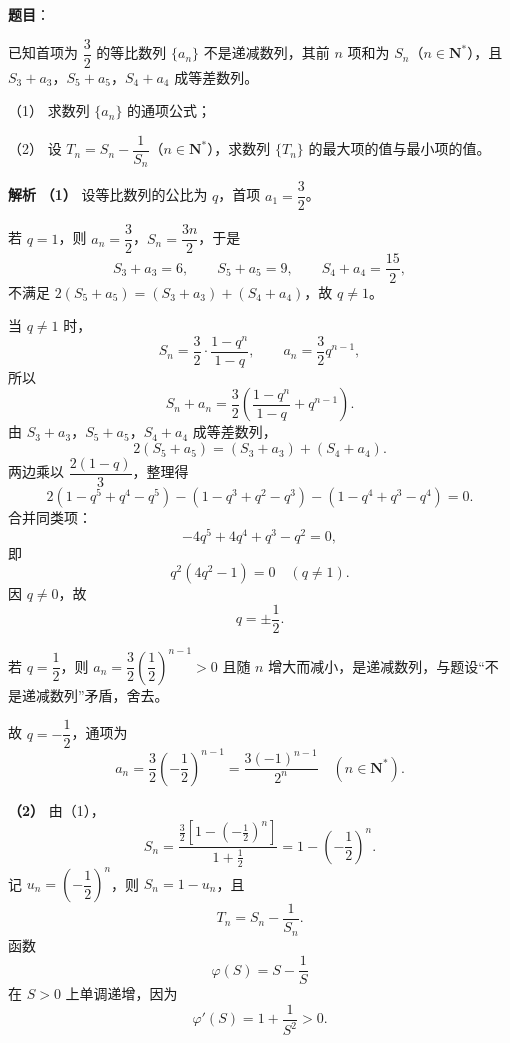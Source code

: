 \begin{answer}

\textbf{题目}：

已知首项为 $\dfrac32$ 的等比数列 $\{a_n\}$ 不是递减数列，其前 $n$ 项和为 $S_n$（$n\in\mathbf{N}^{*}$），且 $S_3+a_3$，$S_5+a_5$，$S_4+a_4$ 成等差数列。

（1） 求数列 $\{a_n\}$ 的通项公式；

（2） 设 $T_n=S_n-\dfrac{1}{S_n}$（$n\in\mathbf{N}^{*}$），求数列 $\{T_n\}$ 的最大项的值与最小项的值。

\textbf{解析}
\textbf{（1）} 设等比数列的公比为 $q$，首项 $a_1=\dfrac32$。

若 $q=1$，则 $a_n=\dfrac32$，$S_n=\dfrac{3n}{2}$，于是
\nopagebreak[4]
\[S_3+a_3=6,\qquad S_5+a_5=9,\qquad S_4+a_4=\frac{15}{2},\]
不满足 $2(S_5+a_5)=(S_3+a_3)+(S_4+a_4)$，故 $q\neq1$。

当 $q\neq1$ 时，
\nopagebreak[4]
\[S_n=\frac32\cdot\frac{1-q^n}{1-q},\qquad a_n=\frac32q^{n-1},\]
所以
\nopagebreak[4]
\[S_n+a_n=\frac32\left(\frac{1-q^n}{1-q}+q^{n-1}\right).\]
由 $S_3+a_3$，$S_5+a_5$，$S_4+a_4$ 成等差数列，
\nopagebreak[4]
\[2(S_5+a_5)=(S_3+a_3)+(S_4+a_4).\]
两边乘以 $\dfrac{2(1-q)}{3}$，整理得
\nopagebreak[4]
\[2(1-q^5+q^4-q^5)
-(1-q^3+q^2-q^3)
-(1-q^4+q^3-q^4)=0.\]
合并同类项：
\nopagebreak[4]
\[-4q^5+4q^4+q^3-q^2=0,\]
即
\nopagebreak[4]
\[q^2(4q^2-1)=0\quad(q\neq1).\]
因 $q\neq0$，故
\nopagebreak[4]
\[q=\pm\frac12.\]

若 $q=\dfrac12$，则 $a_n=\dfrac32\left(\dfrac12\right)^{n-1}>0$ 且随 $n$ 增大而减小，是递减数列，与题设“不是递减数列”矛盾，舍去。

故 $q=-\dfrac12$，通项为
\nopagebreak[4]
\[a_n=\frac32\left(-\frac12\right)^{n-1}
=\frac{3(-1)^{n-1}}{2^n}\quad(n\in\mathbf N^*).\]

\textbf{（2）} 由（1），
\nopagebreak[4]
\[S_n=\frac{\frac32\left[1-\left(-\frac12\right)^n\right]}{1+\frac12}
=1-\left(-\frac12\right)^n.\]
记 $u_n=\left(-\dfrac12\right)^n$，则 $S_n=1-u_n$，且
\nopagebreak[4]
\[T_n=S_n-\frac1{S_n}.\]
函数
\nopagebreak[4]
\[\varphi(S)=S-\frac1S\]
在 $S>0$ 上单调递增，因为
\nopagebreak[4]
\[\varphi'(S)=1+\frac1{S^2}>0.\]


\end{answer}

